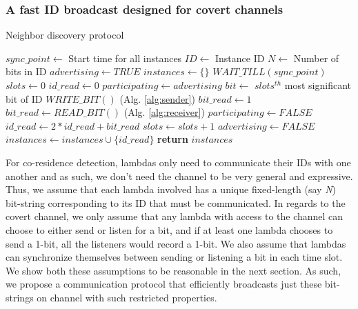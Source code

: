 \subsubsection{A fast ID broadcast designed for covert channels}
\label{sec:method:protocol}


\begin{algorithm}[!t]
\caption{Neighbor discovery protocol}
\label{alg:protcol}
\begin{algorithmic}[1]
\STATE $sync\_point \leftarrow$ {Start time for all instances}
\STATE $ID \leftarrow$ {Instance ID}
\STATE $N \leftarrow$ {Number of bits in ID}
\STATE $advertising \leftarrow TRUE$
\STATE $instances \leftarrow \{\} $
\STATE $WAIT\_TILL(sync\_point)$
    \STATE $slots \leftarrow 0$
    \STATE $id\_read \leftarrow 0$
    \STATE $participating \leftarrow advertising$
        \STATE $bit \leftarrow$ {$slots^{th}$ most significant bit of ID}
            \STATE $WRITE\_BIT()$               (Alg. \ref{alg:sender})
            \STATE $bit\_read \leftarrow 1$
        \ELSE
            \STATE $bit\_read \leftarrow READ\_BIT()$       (Alg. \ref{alg:receiver})
                \STATE $participating \leftarrow FALSE$
            \ENDIF
        \ENDIF
        \STATE $id\_read \leftarrow 2 * id\_read + bit\_read$
        \STATE $slots \leftarrow slots + 1$
    \ENDWHILE
        \STATE $advertising \leftarrow FALSE$
    \ENDIF
    \STATE $instances \leftarrow instances \cup \{id\_read\}$
\ENDWHILE
\STATE \textbf{return} $instances$
\end{algorithmic}
\end{algorithm}

For co-residence detection, lambdas only need to communicate their IDs with one another
and as such, we don't need the channel to be very general and expressive. 
Thus, we assume that each lambda involved has a unique fixed-length (say \emph{N}) 
bit-string corresponding to its ID that must be communicated.  
In regards to the covert channel, we only assume that any lambda with access to the 
channel can choose to either send or listen for a bit, and if at least one lambda 
chooses to send a 1-bit, all the listeners would record a 1-bit. 
We also assume that lambdas can synchronize themselves between sending or listening 
a bit in each time slot. We show both these assumptions to be reasonable in the next section.
As such, we propose a communication protocol that efficiently broadcasts 
just these bit-strings on channel with such restricted properties.

